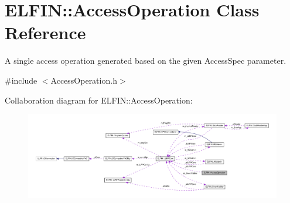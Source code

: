 \hypertarget{class_e_l_f_i_n_1_1_access_operation}{\section{E\-L\-F\-I\-N\-:\-:Access\-Operation Class Reference}
\label{class_e_l_f_i_n_1_1_access_operation}
}


A single access operation generated based on the given Access\-Spec parameter.  




{\ttfamily \#include $<$Access\-Operation.\-h$>$}



Collaboration diagram for E\-L\-F\-I\-N\-:\-:Access\-Operation\-:
\nopagebreak
\begin{figure}[H]
\begin{center}
\leavevmode
\includegraphics[width=350pt]{class_e_l_f_i_n_1_1_access_operation__coll__graph}
\end{center}
\end{figure}
